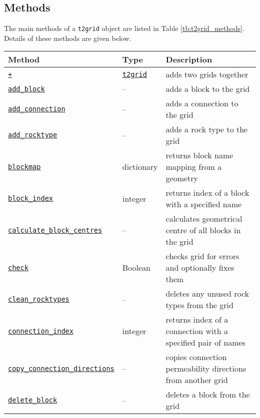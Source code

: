\subsection{Methods}
\label{t2gridmethods}

The main methods of a \texttt{t2grid} object are listed in Table \ref{tb:t2grid_methods}.  Details of these methods are given below.

\begin{table}
  \begin{center}
    \begin{tabular}{|l|l|p{65mm}|}
      \hline
      \textbf{Method} & \textbf{Type} & \textbf{Description}\\
      \hline
      \hyperref[sec:t2grid:plus]{\texttt{+}} & \hyperref[t2grids]{\texttt{t2grid}} & adds two grids together\\
      \hyperref[sec:t2grid:add_block]{\texttt{add\_block}} & -- & adds a block to the grid\\
      \hyperref[sec:t2grid:add_connection]{\texttt{add\_connection}} & -- & adds a connection to the grid\\
      \hyperref[sec:t2grid:add_rocktype]{\texttt{add\_rocktype}} & -- & adds a rock type to the grid\\
      \hyperref[sec:t2grid:blockmap]{\texttt{blockmap}} & dictionary & returns block name mapping from a geometry\\
      \hyperref[sec:t2grid:block_index]{\texttt{block\_index}} & integer & returns index of a block with a specified name\\
      \hyperref[sec:t2grid:calculate_block_centres]{\texttt{calculate\_block\_centres}} & -- & calculates geometrical centre of all blocks in the grid\\
      \hyperref[sec:t2grid:check]{\texttt{check}} & Boolean & checks grid for errors and optionally fixes them\\
      \hyperref[sec:t2grid:clean_rocktypes]{\texttt{clean\_rocktypes}} & -- & deletes any unused rock types from the grid\\
      \hyperref[sec:t2grid:connection_index]{\texttt{connection\_index}} & integer & returns index of a connection with a specified pair of names\\
      \hyperref[sec:t2grid:copy_connection_directions]{\texttt{copy\_connection\_directions}} & -- & copies connection permeability directions from another grid\\
      \hyperref[sec:t2grid:delete_block]{\texttt{delete\_block}} & -- & deletes a block from the grid\\

\end{tabular}
\end{center}
\end{table}
